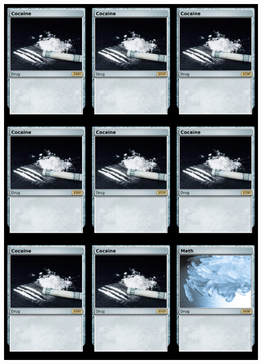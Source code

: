 \documentclass[a4paper]{article}
\begin{document}
\begin{center}
	\centering
	\includegraphics[width=190.5mm,height=266.7mm]{output/temp/page3.png}
\end{center}

\newpage
\end{document}
